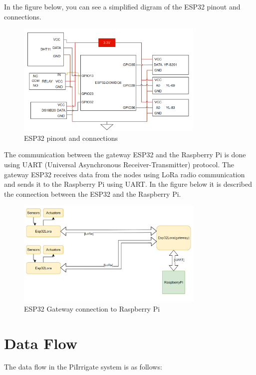 In the figure below, you can see a simplified digram of the ESP32 pinout and connections.

\begin{figure}[H]
    \centering
    \includegraphics[width=0.8\textwidth]{images/esp-diagram.png}
    \caption{ESP32 pinout and connections}
    \label{fig:esp32-pinout}
\end{figure}

The communication between the gateway ESP32 and the Raspberry Pi is done using UART (Universal Asynchronous Receiver-Transmitter) protocol.
The gateway ESP32 receives data from the nodes using LoRa radio communication and sends it to the Raspberry Pi using UART.
In the figure below it is described the connection between the ESP32 and the Raspberry Pi.

\begin{figure}[H]
    \centering
    \includegraphics[width=0.8\textwidth]{images/hardware-architecture.png}
    \caption{ESP32 Gateway connection to Raspberry Pi}
    \label{fig:esp32-gateway}
\end{figure}

\section{Data Flow}
The data flow in the PiIrrigate system is as follows:

